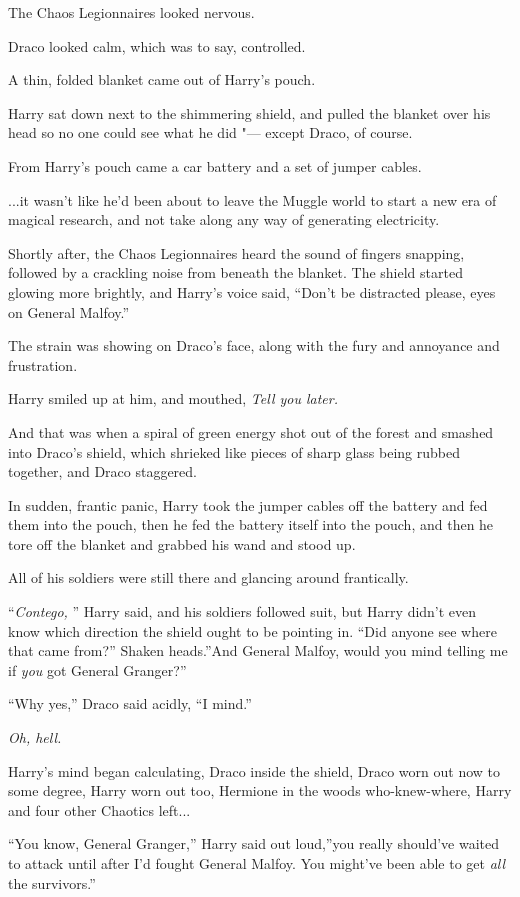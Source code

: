 The Chaos Legionnaires looked nervous.

Draco looked calm, which was to say, controlled.

A thin, folded blanket came out of Harry's pouch.

Harry sat down next to the shimmering shield, and pulled the blanket
over his head so no one could see what he did "--- except Draco, of course.

From Harry's pouch came a car battery and a set of jumper cables.

...it wasn't like he'd been about to leave the Muggle world to
start a new era of magical research, and not take along any way of
generating electricity.

Shortly after, the Chaos Legionnaires heard the sound of fingers
snapping, followed by a crackling noise from beneath the blanket. The
shield started glowing more brightly, and Harry's voice said, ``Don't be
distracted please, eyes on General Malfoy.''

The strain was showing on Draco's face, along with the fury and
annoyance and frustration.

Harry smiled up at him, and mouthed, \emph{Tell you later.}

And that was when a spiral of green energy shot out of the forest and
smashed into Draco's shield, which shrieked like pieces of sharp glass
being rubbed together, and Draco staggered.

In sudden, frantic panic, Harry took the jumper cables off the battery
and fed them into the pouch, then he fed the battery itself into the
pouch, and then he tore off the blanket and grabbed his wand and stood
up.

All of his soldiers were still there and glancing around frantically.

``\emph{Contego,} '' Harry said, and his soldiers followed suit, but Harry
didn't even know which direction the shield ought to be pointing in.
``Did anyone see where that came from?'' Shaken heads.''And General
Malfoy, would you mind telling me if \emph{you} got General Granger?''

``Why yes,'' Draco said acidly, ``I mind.''

\emph{Oh, hell.}

Harry's mind began calculating, Draco inside the shield, Draco worn out
now to some degree, Harry worn out too, Hermione in the woods
who-knew-where, Harry and four other Chaotics left...

``You know, General Granger,'' Harry said out loud,''you really
should've waited to attack until after I'd fought General Malfoy. You
might've been able to get \emph{all} the survivors.''

